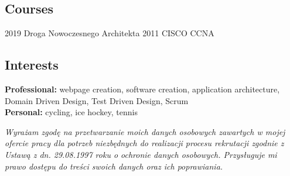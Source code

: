 \documentclass[]{friggeri-cv} %
\begin{document}
	\begin{absolutelynopagebreak}
		\section{Courses}
		\begin{entrylist}
			\cert
			{2019}
			{Droga Nowoczesnego Architekta}
			\cert
			{2011}
			{CISCO CCNA}
		\end{entrylist}
	\end{absolutelynopagebreak}
	
	\begin{absolutelynopagebreak}
		\section{Interests}
		\textbf{Professional: } webpage creation, software creation, application architecture, Domain Driven Design, Test Driven Design, Scrum\\
		\textbf{Personal: } cycling, ice hockey, tennis
	\end{absolutelynopagebreak}
	
	\vfill
	\textit{Wyrażam zgodę na przetwarzanie moich danych osobowych zawartych w mojej ofercie pracy dla potrzeb niezbędnych do realizacji procesu rekrutacji zgodnie z Ustawą z dn. 29.08.1997 roku o ochronie danych osobowych. Przysługuje mi prawo dostępu do treści swoich danych oraz ich poprawiania.}
\end{document}
